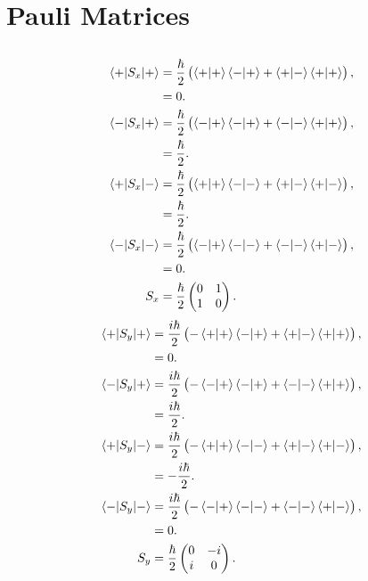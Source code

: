 \documentclass[
a4paper,
10pt,
twoside,
]{article}
\begin{document}
\titleinf
\maketitle
\startmcols

\section{Pauli Matrices}
\subsection{}%
\begin{align}
	\mel{+}{S_x}{+} &= \frac{\hbar}{2} \left(\ip{+}{+}\ip{-}{+} + \ip{+}{-}\ip{+}{+} \right),\\
	&= 0.\\
	\mel{-}{S_x}{+} &= \frac{\hbar}{2} \left(\ip{-}{+}\ip{-}{+} + \ip{-}{-}\ip{+}{+} \right),\\
	&= \frac{\hbar}{2}.\\
	\mel{+}{S_x}{-} &= \frac{\hbar}{2} \left(\ip{+}{+}\ip{-}{-} + \ip{+}{-}\ip{+}{-} \right),\\
	&= \frac{\hbar}{2}.\\
	\mel{-}{S_x}{-} &= \frac{\hbar}{2} \left(\ip{-}{+}\ip{-}{-} + \ip{-}{-}\ip{+}{-} \right),\\
	&= 0.\\
	S_x &= \frac{\hbar}{2}\begin{pmatrix}
		0&1\\1&0
	\end{pmatrix}.
\end{align}
\begin{align}
	\mel{+}{S_y}{+} &= \frac{i\hbar}{2} \left(-\ip{+}{+}\ip{-}{+} + \ip{+}{-}\ip{+}{+} \right),\\
	&= 0.\\
	\mel{-}{S_y}{+} &= \frac{i\hbar}{2} \left(-\ip{-}{+}\ip{-}{+} + \ip{-}{-}\ip{+}{+} \right),\\
	&= \frac{i\hbar}{2}.\\
	\mel{+}{S_y}{-} &= \frac{i\hbar}{2} \left(-\ip{+}{+}\ip{-}{-} + \ip{+}{-}\ip{+}{-} \right),\\
	&= -\frac{i\hbar}{2}.\\
	\mel{-}{S_y}{-} &= \frac{i\hbar}{2} \left(-\ip{-}{+}\ip{-}{-} + \ip{-}{-}\ip{+}{-} \right),\\
	&= 0.\\
	S_y &= \frac{\hbar}{2}\begin{pmatrix}
		0&-i\\i&0
	\end{pmatrix}.
\end{align}
\end{document}
